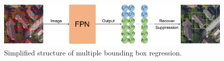 \begin{figure}[!h]
	\centering
	\includegraphics[width=\fig\textwidth]{3-09.pdf}
    \caption[Simplified structure of multiple bounding box regression]{Simplified structure of multiple bounding box regression.}
    \label{fig:simbboxreg}
\end{figure}